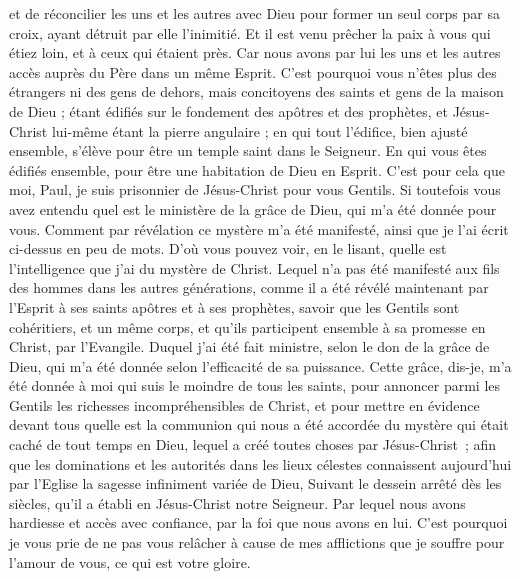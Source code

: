 \begin{multicols}{2}
et de réconcilier les uns et les autres avec Dieu pour former un seul corps par sa croix, ayant détruit par elle l'inimitié.
Et il est venu prêcher la paix à vous qui étiez loin, et à ceux qui étaient près.
Car nous avons par lui les uns et les autres accès auprès du Père dans un même Esprit.
C'est pourquoi vous n'êtes plus des étrangers ni des gens de dehors, mais concitoyens des saints et gens de la maison de Dieu ;
étant édifiés sur le fondement des apôtres et des prophètes, et Jésus-Christ lui-même étant la pierre angulaire ;
en qui tout l’édifice, bien ajusté ensemble, s'élève pour être un temple saint dans le Seigneur.
En qui vous êtes édifiés ensemble, pour être une habitation de Dieu en Esprit.
\VerseOne{}C'est pour cela que moi, Paul, je suis prisonnier de Jésus-Christ pour vous Gentils.
Si toutefois vous avez entendu quel est le ministère de la grâce de Dieu, qui m'a été donnée pour vous.
Comment par révélation ce mystère m'a été manifesté, ainsi que je l'ai écrit ci-dessus en peu de mots.
D'où vous pouvez voir, en le lisant, quelle est l'intelligence que j'ai du mystère de Christ.
Lequel n'a pas été manifesté aux fils des hommes dans les autres générations, comme il a été révélé maintenant par l'Esprit à ses saints apôtres et à ses prophètes,
savoir que les Gentils sont cohéritiers, et un même corps, et qu'ils participent ensemble à sa promesse en Christ, par l'Evangile.
Duquel j'ai été fait ministre, selon le don de la grâce de Dieu, qui m'a été donnée selon l'efficacité de sa puissance.
Cette grâce, dis-je, m'a été donnée à moi qui suis le moindre de tous les saints, pour annoncer parmi les Gentils les richesses incompréhensibles de Christ,
et pour mettre en évidence devant tous quelle est la communion qui nous a été accordée du mystère qui était caché de tout temps en Dieu, lequel a créé toutes choses par Jésus-Christ ;
afin que les dominations et les autorités dans les lieux célestes connaissent aujourd'hui par l'Eglise la sagesse infiniment variée de Dieu,
Suivant le dessein arrêté dès les siècles, qu'il a établi en Jésus-Christ notre Seigneur.
Par lequel nous avons hardiesse et accès avec confiance, par la foi que nous avons en lui.
 C'est pourquoi je vous prie de ne pas vous relâcher à cause de mes afflictions que je souffre pour l'amour de vous, ce qui est votre gloire.

\end{multicols}
